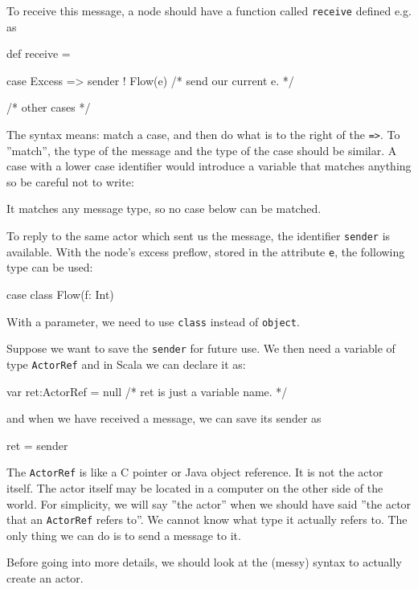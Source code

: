 \documentclass{forsete}
\begin{document}
{To receive this message, a node should have a function called {\tt receive} defined e.g. as
\begin{ccode}
def receive = {

case Excess => { sender ! Flow(e) /* send our current e. */ }

/* other cases */

}
\end{ccode}

The syntax means: match a case, and then do what is to the right of the \verb.=>..
To ''match'', the type of the message and the type of the case should be similar.
A case with a lower case identifier would introduce a variable that matches anything so be 
careful not to write:
\begin{ccode}
case excess => { sender ! Flow(e) /* reply with our current e. */
\end{ccode}
It matches any message type, so no case below can be matched.

To reply to the same actor which sent us the message, the identifier \verb.sender. is available.
With the node's excess preflow, stored in the attribute \verb.e., the following type can be used:
\begin{ccode}
case class Flow(f: Int)
\end{ccode}
With a parameter, we need to use \verb.class. instead of \verb.object..

Suppose we want to save the \verb.sender. for future use. We then need a variable
of type \verb.ActorRef. and in Scala we can declare it as:
\begin{ccode}
var	ret:ActorRef = null	/* ret is just a variable name. */
\end{ccode}
and when we have received a message, we can save its sender as
\begin{ccode}
ret = sender
\end{ccode}

The \verb.ActorRef. is like a C pointer or Java object reference. It is not the actor itself.
The actor itself may be located in a computer on the other side of the world. For simplicity,
we will say ''the actor'' when we should have said ''the actor that an \verb.ActorRef. refers to''.
We cannot know what type it actually refers to. The only thing we can do is to send
a message to it.

Before going into more details, we should look at the (messy) syntax to actually create an actor.

}
\end{document}
